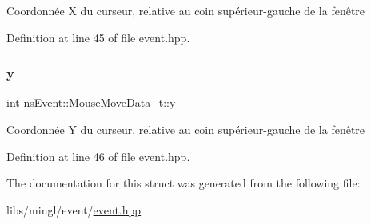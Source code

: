 Coordonnée X du curseur, relative au coin supérieur-\/gauche de la fenêtre 

Definition at line 45 of file event.\+hpp.

\mbox{\label{structns_event_1_1_mouse_move_data__t_a9e72b2e9f3c2f68cc33391d076f2c446}} 
\subsubsection{\texorpdfstring{y}{y}}
{\footnotesize\ttfamily int ns\+Event\+::\+Mouse\+Move\+Data\+\_\+t\+::y}

Coordonnée Y du curseur, relative au coin supérieur-\/gauche de la fenêtre 

Definition at line 46 of file event.\+hpp.



The documentation for this struct was generated from the following file\+:\begin{DoxyCompactItemize}
\item 
libs/mingl/event/\hyperlink{event_8hpp}{event.\+hpp}\end{DoxyCompactItemize}
